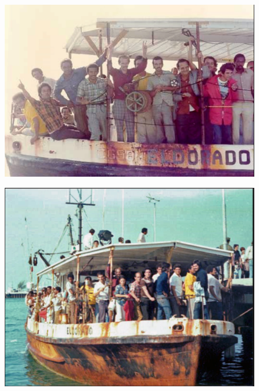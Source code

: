 \documentclass{beamer}
\begin{document}
\begin{frame}[plain]
	\begin{figure}
	\includegraphics[scale=0.25]{./lecture_includes/boatlift2.png}
	\end{figure}
\end{frame}

\begin{frame}[plain]
	\begin{figure}
	\includegraphics[scale=0.25]{./lecture_includes/boatlift3.png}
	\end{figure}
\end{frame}
\end{document}
